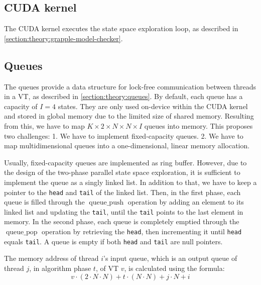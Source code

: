 \documentclass[
fancyheadings, %
%
%
]{stsreprt}
\DeclareMathOperator{\qPop}{queue\_pop}
\DeclareMathOperator{\qPush}{queue\_push}
\begin{document}
\subsection{CUDA kernel}

The CUDA kernel executes the state space exploration loop, as described in \cref{section:theory:grapple-model-checker}.


\subsection{Queues}

The queues provide a data structure for lock-free communication between threads in a VT, as described in \cref{section:theory:queues}.
By default, each queue has a capacity of $I=4$ states.
They are only used on-device within the CUDA kernel and stored in global memory due to the limited size of shared memory.
Resulting from this, we have to map $K \times 2 \times N \times N \times I$ queues into memory.
This proposes two challenges:
1. We have to implement fixed-capacity queues.
2. We have to map multidimensional queues into a one-dimensional, linear memory allocation.

Usually, fixed-capacity queues are implemented as ring buffer.
However, due to the design of the two-phase parallel state space exploration, it is sufficient to implement the queue as a singly linked list.
In addition to that, we have to keep a pointer to the \texttt{head} and \texttt{tail} of the linked list.
Then, in the first phase, each queue is filled through the $\qPush$ operation by adding an element to its linked list and updating the \texttt{tail}, until the \texttt{tail} points to the last element in memory.
In the second phase, each queue is completely emptied through the $\qPop$ operation by retrieving the \texttt{head}, then incrementing it until \texttt{head} equals \texttt{tail}.
A queue is empty if both \texttt{head} and \texttt{tail} are null pointers.

The memory address of thread $i$'s input queue, which is an output queue of thread $j$, in algorithm phase $t$, of VT $v$, is calculated using the formula:
\[v \cdot (2 \cdot N \cdot N) + t \cdot (N \cdot N) + j \cdot N + i\]
\end{document}
